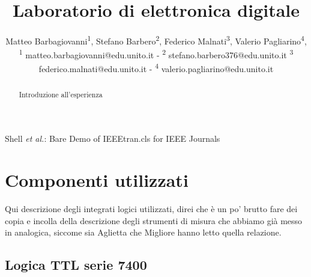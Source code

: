 \documentclass[journal]{IEEEtran}
\begin{document}
\title{Laboratorio di elettronica digitale\\ 
}

\author{\begin{center}Matteo Barbagiovanni\textsuperscript{1},
        Stefano Barbero\textsuperscript{2},
        Federico Malnati\textsuperscript{3},
        Valerio Pagliarino\textsuperscript{4},
        {\small \\
        \textsuperscript{1}
        matteo.barbagiovanni@edu.unito.it -
        \textsuperscript{2}
        stefano.barbero376@edu.unito.it
        \textsuperscript{3}
        federico.malnati@edu.unito.it -
        \textsuperscript{4}
        valerio.pagliarino@edu.unito.it}
        \end{center}}%
        
{Shell \MakeLowercase{\textit{et al.}}: Bare Demo of IEEEtran.cls for IEEE Journals}

\maketitle



\begin{abstract} 
Introduzione all'esperienza
\end{abstract}


\section{Componenti utilizzati}

Qui descrizione degli integrati logici utilizzati, direi che è un po' brutto fare dei copia e incolla della descrizione degli strumenti di misura che abbiamo già messo in analogica, siccome sia Aglietta che Migliore hanno letto quella relazione. 


\subsection{Logica TTL serie 7400}
\end{document}
